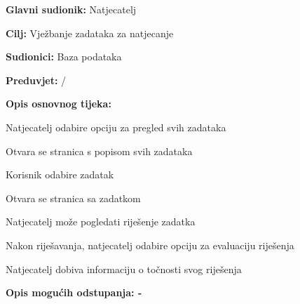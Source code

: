 					\noindent {}
				\begin{packed_item}
					
					\item \textbf{Glavni sudionik: } Natjecatelj
					\item  \textbf{Cilj:} Vježbanje zadataka za natjecanje
					\item  \textbf{Sudionici:} Baza podataka
					\item  \textbf{Preduvjet:}  / 
					\item  \textbf{Opis osnovnog tijeka:}
					
					\item[] \begin{packed_enum}
						\item Natjecatelj odabire opciju za pregled svih zadataka
						\item Otvara se stranica s popisom svih zadataka
						\item Korisnik odabire zadatak	
						\item Otvara se stranica sa zadatkom
						\item Natjecatelj može pogledati riješenje zadatka		
						\item Nakon riješavanja, natjecatelj odabire opciju za evaluaciju riješenja
						\item Natjecatelj dobiva informaciju o točnosti svog riješenja
					\end{packed_enum}
					
					\item  \textbf{Opis mogućih odstupanja: - } 
					
					
				\end{packed_item}
				
